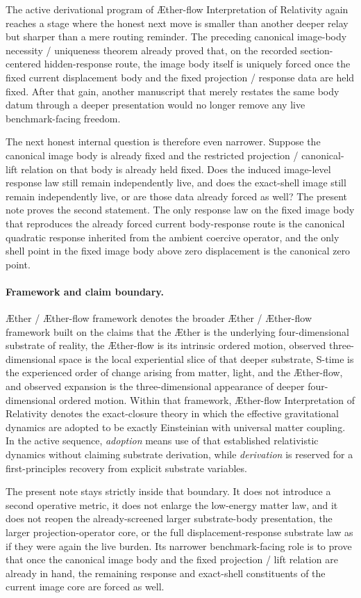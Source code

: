 \documentclass[11pt]{article}
\newcommand{\Aether}{\AE{}ther}
\newcommand{\Aflow}{\AE{}ther-flow}
\newcommand{\TheoryName}{\Aflow{} Interpretation of Relativity}
\newcommand{\TheoryProgram}{\Aether{} / \Aflow{} framework}
\begin{document}
The active derivational program of \TheoryName{} again reaches a stage where the honest next move is smaller than another deeper relay but sharper than a mere routing reminder. The preceding canonical image-body necessity / uniqueness theorem already proved that, on the recorded section-centered hidden-response route, the image body itself is uniquely forced once the fixed current displacement body and the fixed projection / response data are held fixed. After that gain, another manuscript that merely restates the same body datum through a deeper presentation would no longer remove any live benchmark-facing freedom.

The next honest internal question is therefore even narrower. Suppose the canonical image body is already fixed and the restricted projection / canonical-lift relation on that body is already held fixed. Does the induced image-level response law still remain independently live, and does the exact-shell image still remain independently live, or are those data already forced as well? The present note proves the second statement. The only response law on the fixed image body that reproduces the already forced current body-response route is the canonical quadratic response inherited from the ambient coercive operator, and the only shell point in the fixed image body above zero displacement is the canonical zero point.

\paragraph{Framework and claim boundary.}
\TheoryProgram{} denotes the broader \Aether{} / \Aflow{} framework built on the claims that the \Aether{} is the underlying four-dimensional substrate of reality, the \Aflow{} is its intrinsic ordered motion, observed three-dimensional space is the local experiential slice of that deeper substrate, S-time is the experienced order of change arising from matter, light, and the \Aflow{}, and observed expansion is the three-dimensional appearance of deeper four-dimensional ordered motion. Within that framework, \TheoryName{} denotes the exact-closure theory in which the effective gravitational dynamics are adopted to be exactly Einsteinian with universal matter coupling. In the active sequence, \emph{adoption} means use of that established relativistic dynamics without claiming substrate derivation, while \emph{derivation} is reserved for a first-principles recovery from explicit substrate variables.

The present note stays strictly inside that boundary. It does not introduce a second operative metric, it does not enlarge the low-energy matter law, and it does not reopen the already-screened larger substrate-body presentation, the larger projection-operator core, or the full displacement-response substrate law as if they were again the live burden. Its narrower benchmark-facing role is to prove that once the canonical image body and the fixed projection / lift relation are already in hand, the remaining response and exact-shell constituents of the current image core are forced as well.
\end{document}

